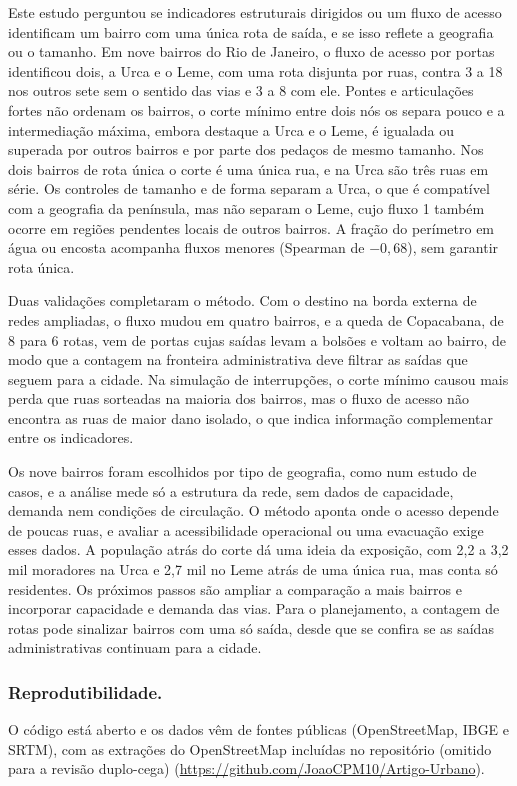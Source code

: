 Este estudo perguntou se indicadores estruturais dirigidos ou um fluxo de
acesso identificam um bairro com uma única rota de saída, e se isso reflete a
geografia ou o tamanho. Em nove bairros do Rio de Janeiro, o fluxo de acesso
por portas identificou dois, a Urca e o Leme, com uma rota disjunta por ruas,
contra 3 a 18 nos outros sete sem o sentido das vias e 3 a 8 com ele. Pontes e
articulações fortes não ordenam os bairros, o corte mínimo entre dois nós os
separa pouco e a intermediação máxima, embora destaque a Urca e o Leme, é
igualada ou superada por outros bairros e por parte dos pedaços de mesmo
tamanho. Nos dois bairros de rota única o corte é uma única rua, e na Urca são
três ruas em série. Os controles de tamanho e de forma separam a Urca, o que é
compatível com a geografia da península, mas não separam o Leme, cujo fluxo 1
também ocorre em regiões pendentes locais de outros bairros. A fração do
perímetro em água ou encosta acompanha fluxos menores (Spearman de $-0{,}68$),
sem garantir rota única.

Duas validações completaram o método. Com o destino na borda externa de redes
ampliadas, o fluxo mudou em quatro bairros, e a queda de Copacabana, de 8 para
6 rotas, vem de portas cujas saídas levam a bolsões e voltam ao bairro, de
modo que a contagem na fronteira administrativa deve filtrar as saídas que
seguem para a cidade. Na simulação de interrupções, o corte mínimo causou mais
perda que ruas sorteadas na maioria dos bairros, mas o fluxo de acesso não
encontra as ruas de maior dano isolado, o que indica informação complementar
entre os indicadores.

Os nove bairros foram escolhidos por tipo de geografia, como num estudo de
casos, e a análise mede só a estrutura da rede, sem dados de capacidade,
demanda nem condições de circulação. O método aponta onde o acesso depende de
poucas ruas, e avaliar a acessibilidade operacional ou uma evacuação exige
esses dados. A população atrás do corte dá uma ideia da exposição, com 2,2 a
3,2 mil moradores na Urca e 2,7 mil no Leme atrás de uma única rua, mas conta
só residentes. Os próximos passos são ampliar a comparação a mais bairros e
incorporar capacidade e demanda das vias. Para o planejamento, a contagem de
rotas pode sinalizar bairros com uma só saída, desde que se confira se as
saídas administrativas continuam para a cidade.

\subsubsection*{Reprodutibilidade.} O código está aberto e os dados vêm de
fontes públicas (OpenStreetMap, IBGE e SRTM), com as extrações do OpenStreetMap
incluídas no repositório \ifcego (omitido para a revisão duplo-cega)\else
(\url{https://github.com/JoaoCPM10/Artigo-Urbano})\fi{}.





